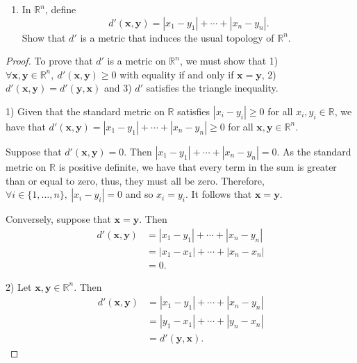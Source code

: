 \documentclass[a4paper,10pt]{article}
\newcommand{\bx}{\mathbf{x}}
\newcommand{\by}{\mathbf{y}}
\newcommand{\RR}{\mathbb{R}}
\begin{document}
\begin{solution}
    \begin{enumerate}[label={(\alph*)}, align=left, leftmargin=\parindent, listparindent=\parindent, labelwidth=0pt, itemindent=!]
        \item In $\RR^n$, define
        \begin{equation*}
            d'(\bx, \by) = |x_1 - y_1| + \cdots + |x_n - y_n|.
        \end{equation*}
        Show that $d'$ is a metric that induces the usual topology of $\RR^n$.
    \end{enumerate}
    \begin{proof}
        To prove that $d'$ is a metric on $\RR^n$, we must show that 1) $\forall \bx, \by \in \RR^n,~ d'(\bx, \by) \geq 0$ with equality if and only if $\bx = \by$, 2) $d'(\bx, \by) = d'(\by, \bx)$ and 3) $d'$ satisfies the triangle inequality.

        1) Given that the standard metric on $\RR$ satisfies $|x_i - y_i| \geq 0$ for all $x_i, y_i \in \RR$, we have that $d'(\bx, \by) = |x_1 - y_1| + \cdots + |x_n - y_n| \geq 0$ for all $\bx, \by \in \RR^n$.

        Suppose that $d'(\bx, \by) = 0$.
        Then $|x_1 - y_1| + \cdots + |x_n - y_n| = 0$.
        As the standard metric on $\RR$ is positive definite, we have that every term in the sum is greater than or equal to zero, thus, they must all be zero.
        Therefore, $\forall i \in \{1, \ldots, n\},~ |x_i - y_i| = 0$ and so $x_i = y_i$.
        It follows that $\bx = \by$.

        Conversely, suppose that $\bx = \by$.
        Then
        \begin{align*}
            d'(\bx, \by)    &= |x_1 - y_1| + \cdots + |x_n - y_n| \\
                            &= |x_1 - x_1| + \cdots + |x_n - x_n| \\
                            &= 0.
        \end{align*}

        2) Let $\bx, \by \in \RR^n$.
        Then
        \begin{align*}
            d'(\bx, \by)    &= |x_1 - y_1| + \cdots + |x_n - y_n| \\
                            &= |y_1 - x_1| + \cdots + |y_n - x_n| \\
                            &= d'(\by, \bx).
        \end{align*}


\end{proof}
\end{solution}
\end{document}
